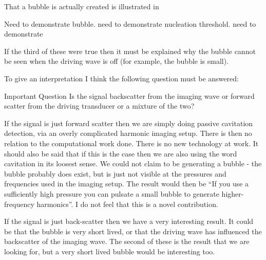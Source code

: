 That a bubble is actually created is illustrated in 

Need to demonstrate bubble.
need to demonstrate nucleation threshold.
need to demonstrate 

%
%



If the third of these were true then it must be explained  why the bubble cannot be seen when the driving wave is off (for example, the bubble is small).

To give an interpretation I think the following question must be answered:

\begin{sidetext}{}{Important Question}
  Is the signal backscatter from the imaging wave or forward scatter from the driving transducer or a mixture of the two?
\end{sidetext}
If the signal is just forward scatter then we are simply doing passive cavitation detection,
via an overly complicated harmonic imaging setup.
There is then no relation to the computational work done.
There is no new technology at work.
It should also be said that if this is the case then we are also using the word cavitation in its loosest sense.
We could not claim to be generating a bubble - the bubble probably does exist, but is just not visible at the pressures and frequencies used in the imaging setup.
The result would then be ``If you use a sufficiently high pressure you can pulsate a small bubble  to generate higher-frequency harmonics''.
I do not feel that this is a novel contribution.


If the signal is just back-scatter then we have a very interesting result.
It could be that the bubble is very short lived, or that the driving wave has influenced the backscatter of the imaging wave.
The second of these is the result that we are looking for, but a very short lived bubble would be interesting too.

